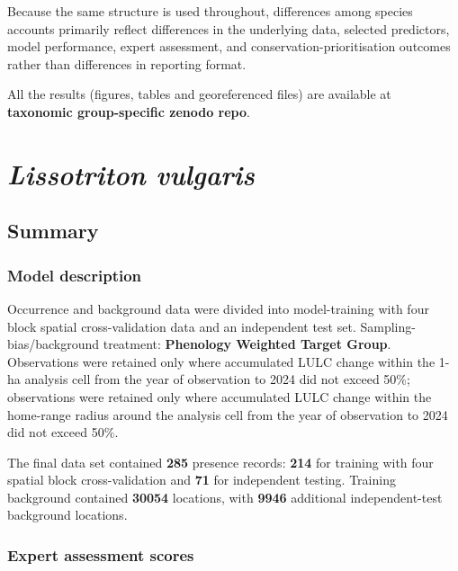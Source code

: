 \documentclass[
  openany]{book}
\begin{document}
Because the same structure is used throughout, differences among species accounts
primarily reflect differences in the underlying data, selected predictors, model
performance, expert assessment, and conservation-prioritisation outcomes rather
than differences in reporting format.

All the results (figures, tables and georeferenced files) are available at
\textbf{taxonomic group-specific zenodo repo}.

\chapter*{\texorpdfstring{\emph{Lissotriton vulgaris}}{Lissotriton vulgaris}}\label{lisvul}

\section*{Summary}\label{summary}

\subsection*{Model description}\label{model-description}

Occurrence and background data were divided into model-training with four block spatial cross-validation data and an independent test set. Sampling-bias/background treatment: \textbf{Phenology Weighted Target Group}. Observations were retained only where accumulated LULC change within the 1-ha analysis cell from the year of observation to 2024 did not exceed 50\%; observations were retained only where accumulated LULC change within the home-range radius around the analysis cell from the year of observation to 2024 did not exceed 50\%.

The final data set contained \textbf{285} presence records: \textbf{214} for training with four spatial block cross-validation and \textbf{71} for independent testing. Training background contained \textbf{30054} locations, with \textbf{9946} additional independent-test background locations.

\subsection*{Expert assessment scores}\label{expert-assessment-scores}
\end{document}
